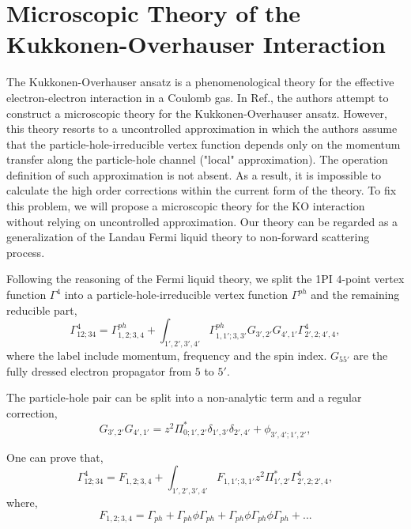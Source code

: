 \documentclass[reprint,amsmath,amssymb,aps,prb]{revtex4-1}
\begin{document}
\section{Microscopic Theory of the Kukkonen-Overhauser Interaction}

The Kukkonen-Overhauser ansatz is a phenomenological theory for the effective electron-electron interaction in a Coulomb gas\cite{kukkonen}. In Ref., the authors attempt to construct a microscopic theory for the Kukkonen-Overhauser ansatz.  However, this theory resorts to a uncontrolled approximation in which the authors assume that the particle-hole-irreducible vertex function depends only on the momentum transfer along the particle-hole channel ("local" approximation). The operation definition of such approximation is not absent. As a result, it is impossible to calculate the high order corrections within the current form of the theory. To fix this problem, we will propose a microscopic theory for the KO interaction without relying on uncontrolled approximation. Our theory can be regarded as a generalization of the Landau Fermi liquid theory to non-forward scattering process.

Following the reasoning of the Fermi liquid theory, we split the 1PI $4$-point vertex function $\Gamma^4$ into a particle-hole-irreducible vertex function $\Gamma^{ph}$ and the remaining reducible part,
\begin{equation}
    \Gamma^4_{12;34}=\Gamma^{ph}_{1,2;3,4}+\int_{1',2',3',4'}\Gamma^{ph}_{1,1';3,3'}G_{3',2'}G_{4',1'}\Gamma^4_{2',2;4',4},
\end{equation}
where the label include momentum, frequency and the spin index. $G_{55'}$ are the fully dressed electron propagator from $5$ to $5'$.

The particle-hole pair can be split into a non-analytic term and a regular correction,
\begin{equation}
    G_{3',2'}G_{4',1'}=z^2\Pi^*_{0; 1',2'}\delta_{1',3'}\delta_{2',4'}+\phi_{3',4';1',2'},
\end{equation}

One can prove that,
\begin{equation}
    \Gamma^4_{12;34}=F_{1,2;3,4}+\int_{1',2',3',4'}F_{1,1';3,1'}z^2\Pi^*_{1',2'}\Gamma^4_{2',2;2',4},
\end{equation}
where,
\begin{equation}
    F_{1,2;3,4} = \Gamma_{ph}+\Gamma_{ph}\phi\Gamma_{ph}+\Gamma_{ph}\phi\Gamma_{ph}\phi\Gamma_{ph}+...
\end{equation}
\end{document}
